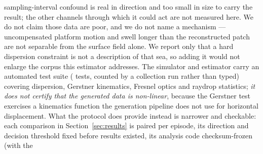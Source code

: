 \documentclass[review]{elsarticle}
\begin{document}
sampling-interval confound is real in direction and too small in size to carry the
result; the other channels through which it could act are not measured here. We do not claim those data
are poor, and we do not name a mechanism --- uncompensated platform motion and swell
longer than the reconstructed patch are not separable from the surface field alone. We
report only that a hard dispersion constraint is not a description of that sea, so
adding it would not enlarge the corpus this estimator addresses.
The simulator and estimator carry an automated test suite
(\DeployNumTestsPaper{} tests, counted by a collection run rather than typed)
covering dispersion, Gerstner kinematics, Fresnel optics and raydrop statistics;
\emph{it does not certify that the generated data is non-linear}, because the
Gerstner test exercises a kinematics function the generation pipeline does not use
for horizontal displacement.
What the protocol does provide instead is narrower and checkable: each comparison
in Section~\ref{sec:results} is paired per episode, its direction and decision
threshold fixed before results existed, its analysis code checksum-frozen (with the
\end{document}
